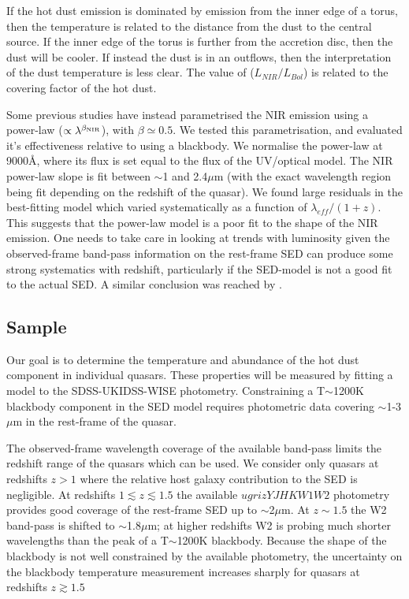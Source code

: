 If the hot dust emission is dominated by emission from the inner edge of a torus, then the temperature is related to the distance from the dust to the central source. 
If the inner edge of the torus is further from the accretion disc, then the dust will be cooler.
If instead the dust is in an outflows, then the interpretation of the dust temperature is less clear.  
The value of ($L_{NIR}/L_{Bol}$) is related to the covering factor of the hot dust. 

Some previous studies \citep[e.g.][]{wang13,zhang14} have instead parametrised the \ac{NIR} emission using a power-law ($\propto \lambda^{\beta_{\rm NIR}}$), with $\beta \simeq 0.5$. 
We tested this parametrisation, and evaluated it's effectiveness relative to using a blackbody. 
We normalise the power-law at 9000\AA, where its flux is set equal to the flux of the UV/optical model. 
The \ac{NIR} power-law slope is fit between $\sim$1 and 2.4$\mu$m (with the exact wavelength region being fit depending on the redshift of the quasar). 
We found large residuals in the best-fitting model which varied systematically as a function of $\lambda_{eff}/(1+z)$.  
This suggests that the power-law model is a poor fit to the shape of the \ac{NIR} emission. 
One needs to take care in looking at trends with luminosity given the observed-frame band-pass information on the rest-frame \ac{SED} can produce some strong systematics with redshift, particularly if the \ac{SED}-model is not a good fit to the actual \ac{SED}. 
A similar conclusion was reached by \citet{gallagher07}.

\subsection{Sample}

Our goal is to determine the temperature and abundance of the hot dust component in individual quasars.  
These properties will be measured by fitting a model to the SDSS-UKIDSS-WISE photometry. 
Constraining a T$\sim$1200K blackbody component in the \ac{SED} model requires photometric data covering $\sim$1-3$\mu$m in the rest-frame of the quasar. 

The observed-frame wavelength coverage of the available band-pass limits the redshift range of the quasars which can be used. 
We consider only quasars at redshifts $z>1$ where the relative host galaxy contribution to the \ac{SED} is negligible. 
At redshifts $1 \lesssim z \lesssim 1.5$ the available $ugrizYJHKW1W2$ photometry provides good coverage of the rest-frame \ac{SED} up to $\sim$2$\mu$m.
At $z\sim1.5$ the W2 band-pass is shifted to $\sim$1.8$\mu$m; at higher redshifts W2 is probing much shorter wavelengths than the peak of a T$\sim$1200K blackbody. 
Because the shape of the blackbody is not well constrained by the available photometry, the uncertainty on the blackbody temperature measurement increases sharply for quasars at redshifts $z\gtrsim1.5$ 

